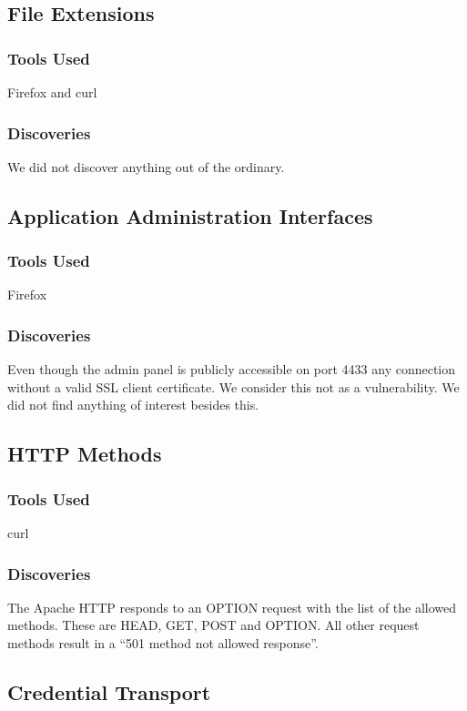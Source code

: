 \documentclass{article}
\begin{document}
\subsection{File Extensions}
\subsubsection{Tools Used}
Firefox and curl

\subsubsection{Discoveries}
We did not discover anything out of the ordinary.

\subsection{Application Administration Interfaces}
\subsubsection{Tools Used}
Firefox

\subsubsection{Discoveries}
Even though the admin panel is publicly accessible on port 4433 any connection without a valid SSL client certificate. We consider this not as a vulnerability.\newline
We did not find anything of interest besides this.


\subsection{HTTP Methods}
\subsubsection{Tools Used}
curl

\subsubsection{Discoveries}
The Apache HTTP responds to an OPTION request with the list of the allowed methods. These are HEAD, GET, POST and OPTION. All other request methods result in a ``501 method not allowed response''.

\subsection{Credential Transport}
\end{document}
